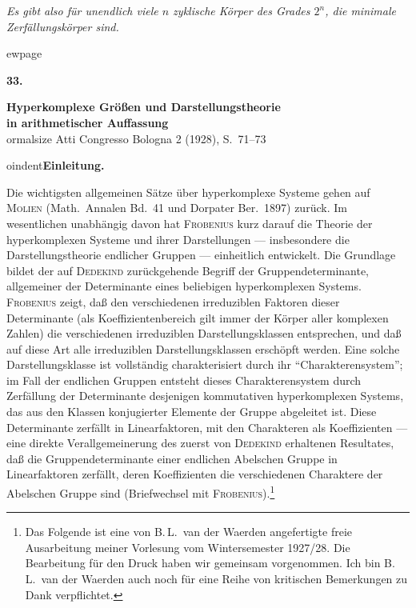\documentclass[12pt,a4paper]{article}
\theoremstyle{definition}
\begin{document}
\textit{Es gibt also f\"ur unendlich viele $n$ zyklische K\"orper des Grades
$2^n$, die minimale Zerf\"allungsk\"orper sind.}



ewpage
\setcounter{page}{574}


\begin{center}
{\Large\bfseries 33.}
\medskip

{\Large\bfseries Hyperkomplexe Gr\"o\ss en und Darstellungstheorie\\[0.3em]
  in arithmetischer Auffassung}\\[0.5em]
{ ormalsize Atti Congresso Bologna 2 (1928), S.\ 71--73}
\end{center}

\vspace{0.5em}



oindent\textbf{Einleitung.}

Die wichtigsten allgemeinen S\"atze \"uber hyperkomplexe Systeme gehen
auf \textsc{Molien} (Math.\ Annalen Bd.\ 41 und Dorpater Ber.\ 1897)
zur\"uck. Im wesentlichen unabh\"angig davon hat \textsc{Frobenius} kurz
darauf die Theorie der hyperkomplexen Systeme und ihrer Darstellungen
--- insbesondere die Darstellungstheorie endlicher Gruppen --- einheitlich
entwickelt. Die Grundlage bildet der auf \textsc{Dedekind} zur\"uckgehende
Begriff der Gruppendeterminante, allgemeiner der Determinante eines
beliebigen hyperkomplexen Systems. \textsc{Frobenius} zeigt, da\ss{} den
verschiedenen irreduziblen Faktoren dieser Determinante (als
Koeffizientenbereich gilt immer der K\"orper aller komplexen Zahlen) die
verschiedenen irreduziblen Darstellungsklassen entsprechen, und da\ss{}
auf diese Art alle irreduziblen Darstellungsklassen ersch\"opft werden.
Eine solche Darstellungsklasse ist vollst\"andig charakterisiert durch ihr
``Charakterensystem''; im Fall der endlichen Gruppen entsteht dieses
Charakterensystem durch Zerf\"allung der Determinante desjenigen
kommutativen hyperkomplexen Systems, das aus den Klassen konjugierter
Elemente der Gruppe abgeleitet ist. Diese Determinante zerf\"allt in
Linearfaktoren, mit den Charakteren als Koeffizienten --- eine direkte
Verallgemeinerung des zuerst von \textsc{Dedekind} erhaltenen Resultates,
da\ss{} die Gruppendeterminante einer endlichen Abelschen Gruppe in
Linearfaktoren zerf\"allt, deren Koeffizienten die verschiedenen
Charaktere der Abelschen Gruppe sind (Briefwechsel mit
\textsc{Frobenius}).\footnote{Das Folgende ist eine von B.\,L.\ van der
Waerden angefertigte freie Ausarbeitung meiner Vorlesung vom
Wintersemester 1927/28. Die Bearbeitung f\"ur den Druck haben wir
gemeinsam vorgenommen. Ich bin B.\,L.\ van der Waerden auch noch f\"ur
eine Reihe von kritischen Bemerkungen zu Dank verpflichtet.}
\end{document}
